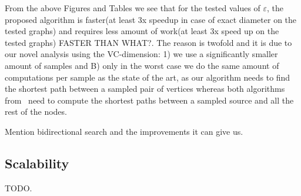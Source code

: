 From the above Figures and Tables we see that for the tested values of
$\varepsilon$, the proposed algorithm is faster(at least 3x speedup in case of
exact diameter on the tested graphs) and requires less amount of work(at least
3x speed up on the tested graphs) \XXX FASTER THAN WHAT?. The reason is twofold
and it is due to our novel analysis using the VC-dimension: 1) we use a
significantly smaller amount of samples and B) only in the
worst case  we do the same amount of computations per sample as
the state of the art, as our algorithm needs to find the shortest path between a
sampled pair of vertices whereas both 
algorithms from~\citep{GeisbergerSS08,BrandesP07}  need to compute the shortest
paths between a sampled source and all the rest of the nodes.

\XXX Mention bidirectional search and the improvements it can give us.

\subsection{Scalability}\label{sec:scalability}
\XXX TODO.


